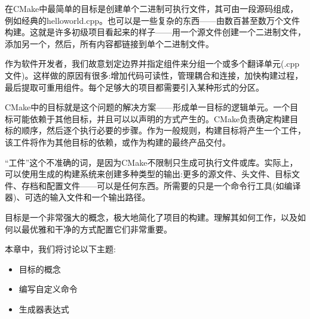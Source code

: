 
在CMake中最简单的目标是创建单个二进制可执行文件，其可由一段源码组成，例如经典的helloworld.cpp。也可以是一些复杂的东西——由数百甚至数万个文件构建。这就是许多初级项目看起来的样子——用一个源文件创建一个二进制文件，添加另一个，然后，所有内容都链接到单个二进制文件。

作为软件开发者，我们故意划定边界并指定组件来分组一个或多个翻译单元(.cpp文件)。这样做的原因有很多:增加代码可读性，管理耦合和连接，加快构建过程，最后提取可重用组件。每个足够大的项目都需要引入某种形式的分区。

CMake中的目标就是这个问题的解决方案——形成单一目标的逻辑单元。一个目标可能依赖于其他目标，并且可以以声明的方式产生的。CMake负责确定构建目标的顺序，然后逐个执行必要的步骤。作为一般规则，构建目标将产生一个工件，该工件将作为其他目标的依赖，或作为构建的最终产品交付。

“工件”这个不准确的词，是因为CMake不限制只生成可执行文件或库。实际上，可以使用生成的构建系统来创建多种类型的输出:更多的源文件、头文件、目标文件、存档和配置文件——可以是任何东西。所需要的只是一个命令行工具(如编译器)、可选的输入文件和一个输出路径。

目标是一个非常强大的概念，极大地简化了项目的构建。理解其如何工作，以及如何以最优雅和干净的方式配置它们非常重要。

本章中，我们将讨论以下主题:

\begin{itemize}
\item 
目标的概念

\item 
编写自定义命令

\item 
生成器表达式
\end{itemize}